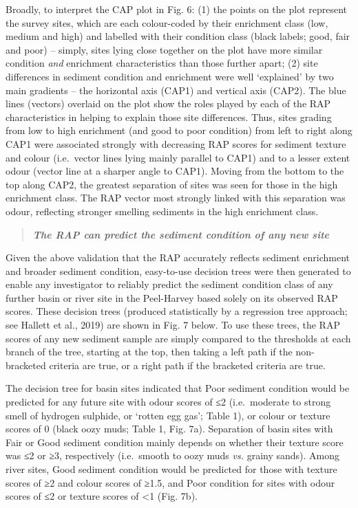 \documentclass[
]{book}
\begin{document}
Broadly, to interpret the CAP plot in Fig. 6: (1) the points on the plot represent the survey sites, which are each colour-coded by their enrichment class (low, medium and high) and labelled with their condition class (black labels; good, fair and poor) -- simply, sites lying close together on the plot have more similar condition \emph{and} enrichment characteristics than those further apart; (2) site differences in sediment condition and enrichment were well `explained' by two main gradients -- the horizontal axis (CAP1) and vertical axis (CAP2). The blue lines (vectors) overlaid on the plot show the roles played by each of the RAP characteristics in helping to explain those site differences. Thus, sites grading from low to high enrichment (and good to poor condition) from left to right along CAP1 were associated strongly with decreasing RAP scores for sediment texture and colour (i.e.~vector lines lying mainly parallel to CAP1) and to a lesser extent odour (vector line at a sharper angle to CAP1). Moving from the bottom to the top along CAP2, the greatest separation of sites was seen for those in the high enrichment class. The RAP vector most strongly linked with this separation was odour, reflecting stronger smelling sediments in the high enrichment class.

\begin{quote}
\textbf{\emph{The RAP can predict the sediment condition of any new site}}
\end{quote}

Given the above validation that the RAP accurately reflects sediment enrichment and broader sediment condition, easy-to-use decision trees were then generated to enable any investigator to reliably predict the sediment condition class of any further basin or river site in the Peel-Harvey based solely on its observed RAP scores. These decision trees (produced statistically by a regression tree approach; see Hallett et al., 2019) are shown in Fig. 7 below. To use these trees, the RAP scores of any new sediment sample are simply compared to the thresholds at each branch of the tree, starting at the top, then taking a left path if the non-bracketed criteria are true, or a right path if the bracketed criteria are true.~

The decision tree for basin sites indicated that Poor sediment condition would be predicted for any future site with odour scores of ≤2 (i.e.~moderate to strong smell of hydrogen sulphide, or `rotten egg gas'; Table 1), or colour or texture scores of 0 (black oozy muds; Table 1, Fig. 7a). Separation of basin sites with Fair or Good sediment condition mainly depends on whether their texture score was ≤2 or ≥3, respectively (i.e.~smooth to oozy muds \emph{vs.} grainy sands). Among river sites, Good sediment condition would be predicted for those with texture scores of ≥2 and colour scores of ≥1.5, and Poor condition for sites with odour scores of ≤2 or texture scores of \textless1 (Fig. 7b).
\end{document}
